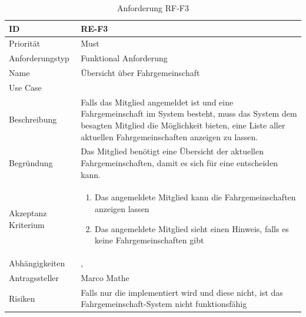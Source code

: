 \begin{table}[ht]
\centering
  \begin{tabular}{ l | p{8cm} }
	\hline
	\rowcolor{gray}
	ID 			&	\textbf{RE-F3}\\ \hline
	Priorität 		&	Must\\ \hline
	Anforderungstyp	&	Funktional Anforderung\\ \hline
	Name 			&	Übersicht über Fahrgemeinschaft\\ \hline
	Use Case 		&	\nameref{table:use_case_2}\\ \hline
	Beschreibung 	&	Falls das Mitglied angemeldet ist und eine Fahrgemeinschaft im System besteht, muss das System dem besagten Mitglied die Möglichkeit bieten, eine Liste aller aktuellen Fahrgemeinschaften anzeigen zu lassen.\\ \hline
	Begründung 		&	Das Mitglied benötigt eine Übersicht der aktuellen Fahrgemeinschaften, damit es sich für eine entscheiden kann.\\ \hline
	Akzeptanz Kriterium	&	\begin{enumerate}
					\item Das angemeldete Mitglied kann die Fahrgemeinschaften anzeigen lassen
					\item Das angemeldete Mitglied sieht einen Hinweis, falls es keine Fahrgemeinschaften gibt
					\end{enumerate}
					\\ \hline
	Abhängigkeiten 	&	\nameref{table:req_1}, \nameref{table:req_2}\\ \hline
	Antragssteller 	&	Marco Mathe\\ \hline
	Risiken	 	&	Falls nur die \nameref{table:req_2} implementiert wird und diese nicht, ist das Fahrgemeinschaft-System nicht funktionsfähig
  \end{tabular}
   \caption{Anforderung RF-F3}\label{table:req_3}
\end{table}

